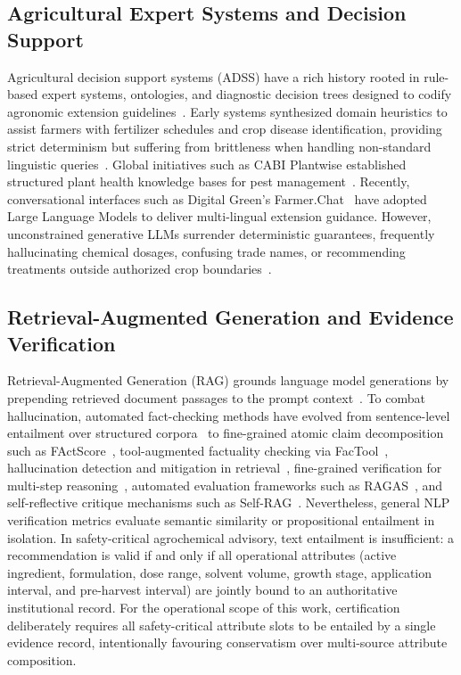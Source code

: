 \documentclass[11pt,a4paper]{article}
\begin{document}
\subsection{Agricultural Expert Systems and Decision Support}
Agricultural decision support systems (ADSS) have a rich history rooted in rule-based expert systems, ontologies, and diagnostic decision trees designed to codify agronomic extension guidelines~\cite{liao2005expert, prasad2008hybrid}. Early systems synthesized domain heuristics to assist farmers with fertilizer schedules and crop disease identification, providing strict determinism but suffering from brittleness when handling non-standard linguistic queries~\cite{mahant2022ai}. Global initiatives such as CABI Plantwise established structured plant health knowledge bases for pest management~\cite{cabi2020plantwise}. Recently, conversational interfaces such as Digital Green's Farmer.Chat~\cite{farmerchat2024} have adopted Large Language Models to deliver multi-lingual extension guidance. However, unconstrained generative LLMs surrender deterministic guarantees, frequently hallucinating chemical dosages, confusing trade names, or recommending treatments outside authorized crop boundaries~\cite{mahant2022ai, krishokchat2026}.

\subsection{Retrieval-Augmented Generation and Evidence Verification}
Retrieval-Augmented Generation (RAG) grounds language model generations by prepending retrieved document passages to the prompt context~\cite{lewis2020rag, gao2023ragsurvey}. To combat hallucination, automated fact-checking methods have evolved from sentence-level entailment over structured corpora~\cite{thorne2018fever} to fine-grained atomic claim decomposition such as FActScore~\cite{min2023factscore}, tool-augmented factuality checking via FacTool~\cite{chern2023factool}, hallucination detection and mitigation in retrieval~\cite{ren2024investigating, varshney2023stitch}, fine-grained verification for multi-step reasoning~\cite{malladi2024fine}, automated evaluation frameworks such as RAGAS~\cite{es2024ragas}, and self-reflective critique mechanisms such as Self-RAG~\cite{asai2024selfrag}. Nevertheless, general NLP verification metrics evaluate semantic similarity or propositional entailment in isolation. In safety-critical agrochemical advisory, text entailment is insufficient: a recommendation is valid if and only if all operational attributes (active ingredient, formulation, dose range, solvent volume, growth stage, application interval, and pre-harvest interval) are jointly bound to an authoritative institutional record. For the operational scope of this work, certification deliberately requires all safety-critical attribute slots to be entailed by a single evidence record, intentionally favouring conservatism over multi-source attribute composition.
\end{document}
